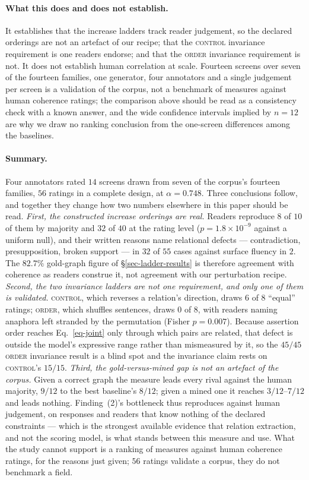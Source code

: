 \paragraph{What this does and does not establish.} It establishes that the increase ladders track
reader judgement, so the declared orderings are not an artefact of our recipe; that the
\textsc{control} invariance requirement is one readers endorse; and that the \textsc{order} invariance
requirement is not. It does not establish human correlation at scale. Fourteen screens over seven of
the fourteen families, one generator, four annotators and a single judgement per screen is a
validation of the corpus, not a benchmark of measures against human coherence ratings; the
comparison above should be read as a consistency check with a known answer, and the wide confidence
intervals implied by $n=12$ are why we draw no ranking conclusion from the one-screen differences among
the baselines.

\paragraph{Summary.} Four annotators rated $14$ screens drawn from seven of the corpus's fourteen
families, $56$ ratings in a complete design, at $\alpha=0.748$. Three conclusions follow, and together
they change how two numbers elsewhere in this paper should be read. \emph{First, the constructed
increase orderings are real.} Readers reproduce $8$ of $10$ of them by majority and $32$ of $40$ at the
rating level ($p=1.8\times10^{-9}$ against a uniform null), and their written reasons name relational
defects --- contradiction, presupposition, broken support --- in $32$ of $55$ cases against surface
fluency in $2$. The $82.7\%$ gold-graph figure of \S\ref{sec-ladder-results} is therefore agreement
with coherence as readers construe it, not agreement with our perturbation recipe. \emph{Second, the
two invariance ladders are not one requirement, and only one of them is validated.} \textsc{control},
which reverses a relation's direction, draws $6$ of $8$ ``equal'' ratings; \textsc{order}, which
shuffles sentences, draws $0$ of $8$, with readers naming anaphora left stranded by the permutation
(Fisher $p=0.007$). Because assertion order reaches Eq.~\ref{eq-joint} only through which pairs are
related, that defect is outside the model's expressive range rather than mismeasured by it, so the
$45/45$ \textsc{order} invariance result is a blind spot and the invariance claim rests on
\textsc{control}'s $15/15$. \emph{Third, the gold-versus-mined gap is not an artefact of the corpus.}
Given a correct graph the measure leads every rival against the human majority, $9/12$ to the best
baseline's $8/12$; given a mined one it reaches $3/12$--$7/12$ and leads nothing. Finding~(2)'s
bottleneck thus reproduces against human judgement, on responses and readers that know nothing of the
declared constraints --- which is the strongest available evidence that relation extraction, and not
the scoring model, is what stands between this measure and use. What the study cannot support is a
ranking of measures against human coherence ratings, for the reasons just given; $56$ ratings validate
a corpus, they do not benchmark a field.


